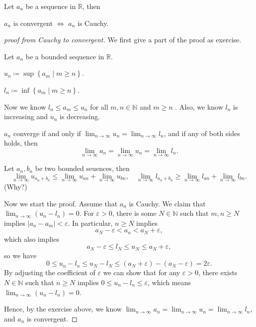 \begin{theorem}\label{thm: convergent iff cauchy}
    Let \(a_n\) be a sequence in \(\mathbb{R} \), then 
    \begin{center}
        \(a_n\) is convergent \(\iff\) \(a_n\) is Cauchy.   
    \end{center}
\end{theorem}
\begin{proof}[proof from Cauchy to convergent]
    We first give a part of the proof as exercise.
    \begin{definition*}
        Let \(a_n\) be a bounded sequence in \(\mathbb{R} \).   
    \end{definition*}
    \begin{definition*}
        \(u_n \coloneqq \sup \left\{ a_m \mid m \geq n \right\} \). 
    \end{definition*}
    \begin{definition*}
        \(l_n \coloneqq \inf \left\{ a_m \mid m \geq n \right\} \). 
    \end{definition*}
    Now we know \(l_n \le a_m \le u_n \) for all \(m,n \in \mathbb{N} \) and \(m \geq n\) . Also, we know \(l_n\) is increasing and \(u_n\) is decreasing. 
    \begin{exercise}
        \(a_n\) converge if and only if \(\lim_{n \to \infty} u_n = \lim_{n \to \infty} l_n\), and if any of both sides holds, then 
        \[
            \lim_{n \to \infty} a_n = \lim_{n \to \infty} u_n = \lim_{n \to \infty} l_n.   
        \]  
    \end{exercise}

    Let \(a_n, b_n\) be two bounded seuences, then 
    \[
        \lim_{n \to \infty} u_{a_n + b_n} \le \lim_{n \to \infty} u_{an} + \lim_{n \to \infty} u_{bn}, \quad \lim_{n \to \infty} l_{a_n + b_n} \ge \lim_{n \to \infty} l_{an} + \lim_{n \to \infty} l_{bn}.     
    \] (Why?) 

    Now we start the proof. Assume that \(a_n\) is Cauchy. We claim that \(\lim_{n \to \infty} (u_n - l_n) = 0\). For \(\varepsilon > 0\), there is some \(N \in \mathbb{N} \) such that \(m,n \ge N\) implies \(\left\vert a_n - a_m \right\vert < \varepsilon  \). In particular, \(n \ge N\) implies
    \[
        a_N - \varepsilon < a_n < a_N + \varepsilon,
    \]      
    which also implies 
    \[
        a_N - \varepsilon \le l_N \le u_N \le a_N + \varepsilon ,
    \]
    so we have 
    \[
        0 \le u_n - l_n \le u_N - l_N \le (a_N + \varepsilon) - (a_N - \varepsilon ) = 2\varepsilon.
    \]
    By adjusting the coefficient of \(\varepsilon \) we can show that for any \(\varepsilon > 0\), there exists \(N \in \mathbb{N} \) such that \(n \geq N\) implies \(0 \le u_n - l_n \le \varepsilon \), which means \(\lim_{n \to \infty} (u_n - l_n) = 0\).
    
    Hence, by the exercise above, we know \(\lim_{n \to \infty} a_n = \lim_{n \to \infty} u_n = \lim_{n \to \infty} l_n  \), and \(a_n\) is convergent. 
\end{proof}
